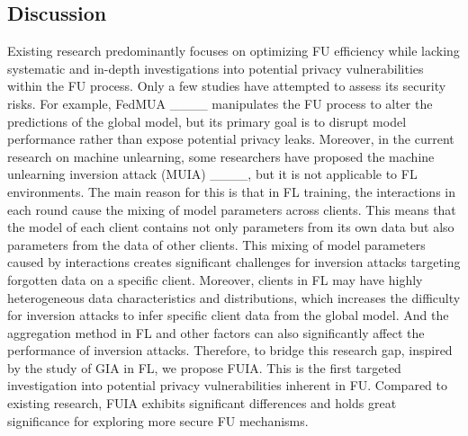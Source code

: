 \subsection{Discussion}
Existing research predominantly focuses on optimizing FU efficiency while lacking systematic and in-depth investigations into potential privacy vulnerabilities within the FU process.
Only a few studies have attempted to assess its security risks. For example, FedMUA ____ manipulates the FU process to alter the predictions of the global model, but its primary goal is to disrupt model performance rather than expose potential privacy leaks.  
Moreover, in the current research on machine unlearning, some researchers have proposed the machine unlearning inversion attack (MUIA) ____, but it is not applicable to FL environments. The main reason for this is that in FL training, the interactions in each round cause the mixing of model parameters across clients. This means that the model of each client contains not only parameters from its own data but also parameters from the data of other clients. This mixing of model parameters caused by interactions creates significant challenges for inversion attacks targeting forgotten data on a specific client. Moreover, clients in FL may have highly heterogeneous data characteristics and distributions, which increases the difficulty for inversion attacks to infer specific client data from the global model. And the aggregation method in FL and other factors can also significantly affect the performance of inversion attacks.   
Therefore, to bridge this research gap, inspired by the study of GIA in FL, we propose FUIA. This is the first targeted investigation into potential privacy vulnerabilities inherent in FU.
Compared to existing research, FUIA exhibits significant differences and holds great significance for exploring more secure FU mechanisms.